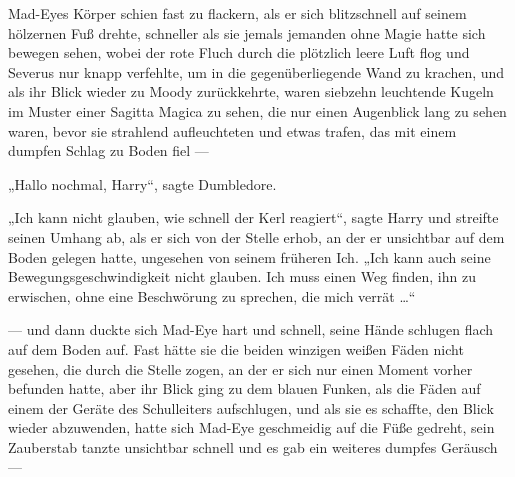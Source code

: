 Mad-Eyes Körper schien fast zu flackern, als er sich blitzschnell auf seinem hölzernen Fuß drehte, schneller als sie jemals jemanden ohne Magie hatte sich bewegen sehen, wobei der rote Fluch durch die plötzlich leere Luft flog und Severus nur knapp verfehlte, um in die gegenüberliegende Wand zu krachen, und als ihr Blick wieder zu Moody zurückkehrte, waren siebzehn leuchtende Kugeln im Muster einer Sagitta Magica zu sehen, die nur einen Augenblick lang zu sehen waren, bevor sie strahlend aufleuchteten und etwas trafen, das mit einem dumpfen Schlag zu Boden fiel —

\later

„Hallo nochmal, Harry“, sagte Dumbledore.

„Ich kann nicht glauben, wie schnell der Kerl reagiert“, sagte Harry und streifte seinen Umhang ab, als er sich von der Stelle erhob, an der er unsichtbar auf dem Boden gelegen hatte, ungesehen von seinem früheren Ich.
„Ich kann auch seine Bewegungsgeschwindigkeit nicht glauben. Ich muss einen Weg finden, ihn zu erwischen, ohne eine Beschwörung zu sprechen, die mich verrät …“

\later

— und dann duckte sich Mad-Eye hart und schnell, seine Hände schlugen flach auf dem Boden auf. Fast hätte sie die beiden winzigen weißen Fäden nicht gesehen, die durch die Stelle zogen, an der er sich nur einen Moment vorher befunden hatte, aber ihr Blick ging zu dem blauen Funken, als die Fäden auf einem der Geräte des Schulleiters aufschlugen, und als sie es schaffte, den Blick wieder abzuwenden, hatte sich Mad-Eye geschmeidig auf die Füße gedreht, sein Zauberstab tanzte unsichtbar schnell und es gab ein weiteres dumpfes Geräusch —

